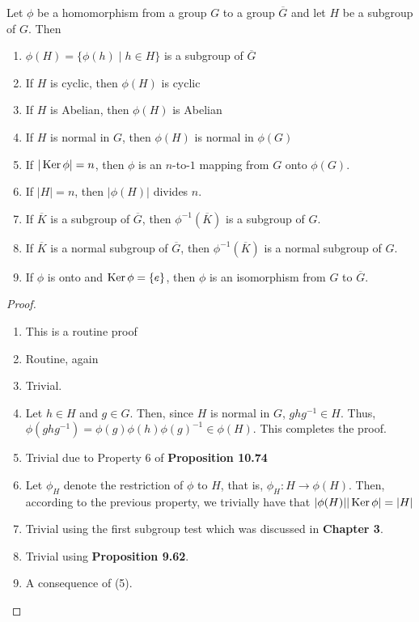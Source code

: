 \begin{proposition}
	Let $\phi$ be a homomorphism from a group $G$ to a group $\overline{G}$ and let $H$ be a subgroup of $G$. Then
	\begin{enumerate}
		\item $\phi(H)=\{\phi(h)\mid h\in H\}$ is a subgroup of $\overline{G}$
		\item If $H$ is cyclic, then $\phi(H)$ is cyclic
		\item If $H$ is Abelian, then $\phi(H)$ is Abelian
		\item If $H$ is normal in $G$, then $\phi(H)$ is normal in $\phi(G)$
		\item If $|\operatorname{Ker}\phi|=n$, then $\phi$ is an $n$-to-$1$ mapping from $G$ onto $\phi(G)$.
		\item If $|H|=n$, then $|\phi(H)|$ divides $n$.
		\item If $\overline{K}$ is a subgroup of $\overline{G}$, then $\phi^{-1}(\overline{K})$ is a subgroup of $G$.
		\item If $\overline{K}$ is a normal subgroup of $\overline{G}$, then $\phi^{-1}(\overline{K})$ is a normal subgroup of $G$.
		\item If $\phi$ is onto and $\operatorname{Ker}\phi=\{e\}$, then $\phi$ is an isomorphism from $G$ to $\overline{G}$. 
	\end{enumerate}
\end{proposition}
\begin{proof}\hfill
	\begin{enumerate}
		\item This is a routine proof
		\item Routine, again
		\item Trivial.
		\item Let $h\in H$ and $g\in G$. Then, since $H$ is normal in $G$, $ghg^{-1}\in H$. Thus, $\phi(ghg^{-1}) = \phi(g)\phi(h)\phi(g)^{-1}\in\phi(H)$. This completes the proof.
		\item Trivial due to Property 6 of \textbf{Proposition 10.74}
		\item Let $\phi_H$ denote the restriction of $\phi$ to $H$, that is, $\phi_H:H\to\phi(H)$. Then, according to the previous property, we trivially have that $|\phi(H)||\operatorname{Ker} \phi| = |H|$
		\item Trivial using the first subgroup test which was discussed in \textbf{Chapter 3}.
		\item Trivial using \textbf{Proposition 9.62}.
		\item A consequence of (5).
	\end{enumerate}
\end{proof}

